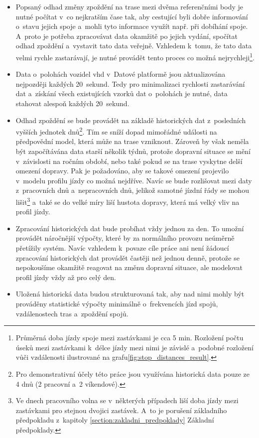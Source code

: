 \begin{itemize}
\item
Popsaný odhad změny zpoždění na trase mezi dvěma referenčními body je nutné počítat v~co nejkratším čase tak, aby cestující byli dobře informování o~stavu jejich spoje a~mohli tyto informace využít např. při dobíhání spoje. A~proto je potřeba zpracovávat data okamžitě po jejich vydání, spočítat odhad zpoždění a~vystavit tato data veřejně. Vzhledem k~tomu, že tato data velmi rychle zastarávají, je nutné provádět tento proces co možná nejrychleji\footnote{Průměrná doba jízdy spoje mezi zastávkami je cca 5 min. Rozložení počtu úseků mezi zastávkami k~délce jízdy mezi nimi je závislé a~podobné rozložení vůči vzdálenosti ilustrované na grafu\ref{fig:stop_distances_result}.}.


\item
Data o~polohách vozidel \gls{vhd} v~Datové platformě jsou aktualizována nejpozději každých 20~sekund. Tedy pro minimalizaci rychlosti zastarávání dat a~získání všech existujících vzorků dat o~polohách je nutné, data stahovat alespoň každých 20~sekund.


\item
Odhad zpoždění se bude provádět na základě historických dat z~posledních vyšších jednotek dnů\footnote{Pro demonstrativní účely této práce jsou využívána historická data pouze ze 4 dnů (2 pracovní a~2 víkendové).}. Tím se sníží dopad mimořádné události na předpovědní model, která může na trase vzniknout. Zároveň by však neměla být započítávána data starší několik týdnů, protože dopravní situace se mění v~závislosti na ročním období, nebo také pokud se na trase vyskytne delší omezení dopravy. Pak je požadováno, aby se takové omezení projevilo v~modelu profilu jízdy co možná nejdříve. Navíc se bude rozlišovat mezi daty z~pracovních dnů a~nepracovních dnů, jelikož samotné jízdní řády se mohou lišit\footnote{Ve dnech pracovního volna se v~některých případech liší doba jízdy mezi zastávkami pro stejnou dvojici zastávek. A~to je porušení základního předpokladu z~kapitoly \ref{section:zakladni_predpoklady} Základní předpoklady.} a~také se do velké míry liší hustota dopravy, která má velký vliv na profil jízdy.


\item
Zpracování historických dat bude probíhat vždy jednou za den. To umožní provádět náročnější výpočty, které by za normálního provozu neúměrně přetížily systém. Navíc vzhledem k~povaze cíle práce ani není žádoucí zpracování historických dat provádět častěji než jednou denně, protože se nepokoušíme okamžitě reagovat na změnu dopravní situace, ale modelovat profil jízdy vždy až pro celý den.

\item
Uložená historická data budou strukturovaná tak, aby nad nimi mohly být prováděny statistické výpočty minimálně o~frekvencích jízd spojů, vzdálenostech tras a~zpoždění spojů.
\end{itemize}


